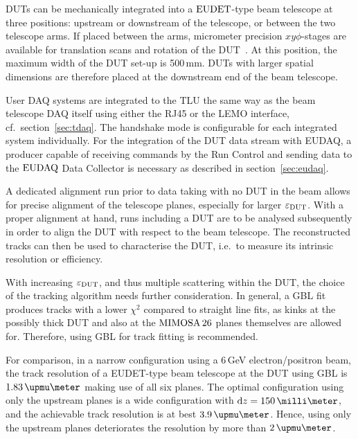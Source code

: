 DUTs can be mechanically integrated into a $\textrm{EUDET}$-type beam telescope at three positions: upstream or downstream of the telescope, or between the two telescope arms.
If placed between the arms, micrometer precision $xy\phi$-stages are available for translation scans and rotation of the DUT~\cite{Mimosa-twiki}.
At this position, the maximum width of the DUT set-up is 500\,mm.
DUTs with larger spatial dimensions are therefore placed at the downstream end of the beam telescope. 

User DAQ systems are integrated to the TLU the same way as the beam telescope DAQ itself using either the RJ45 or the LEMO interface, cf.~section~\ref{sec:tdaq}.
The handshake mode is configurable for each integrated system individually. 
For the integration of the DUT data stream with EUDAQ, a producer capable of receiving commands by the Run Control and sending data to the $\textrm{EUDAQ}$ Data Collector is necessary
 as described in section~\ref{sec:eudaq}.

A dedicated alignment run prior to data taking with no DUT in the beam allows for precise alignment of the telescope planes, especially for larger $\mathnormal{\varepsilon_{\textrm{DUT}}}$. 
With a proper alignment at hand, runs including a DUT are to be analysed subsequently in order to align the DUT with respect to the beam telescope. 
The reconstructed tracks can then be used to characterise the DUT, i.e.~to measure its intrinsic resolution or efficiency. 

With increasing $\mathnormal{\varepsilon_{\textrm{DUT}}}$, and thus multiple scattering within the DUT, the choice of the tracking algorithm needs further consideration. 
In general, a GBL fit produces tracks with a lower $\chi^2$ compared to straight line fits,
 as kinks at the possibly thick DUT and also at the $\textrm{MIMOSA\,26}$ planes themselves are allowed for.
Therefore, using GBL for track fitting is recommended. 

For comparison, in a narrow configuration using a 6\,GeV electron/positron beam,
 the track resolution of a EUDET-type beam telescope at the DUT using GBL is $1.83\,\upmu\meter$ making use of all six planes. 
The optimal configuration using only the upstream planes is a wide configuration with $\dz = 150\,\milli\meter$,
 and the achievable track resolution is at best $3.9\,\upmu\meter$. 
Hence, using only the upstream planes deteriorates the resolution by more than $2\,\upmu\meter$.

